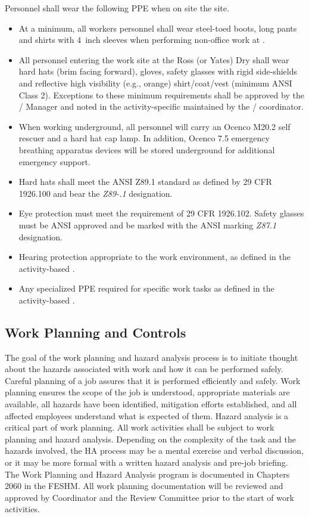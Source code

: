 Personnel shall wear the following PPE when on site the  site.
\begin{itemize}
\item At a minimum, all workers personnel shall wear
  steel-toed boots, long pants and shirts with 4~inch sleeves when
  performing non-office work at . 
  \item All personnel entering the work site at the Ross (or Yates) Dry
    shall wear hard hats (brim facing forward), gloves,
    safety glasses with rigid side-shields and reflective high
    visibility (e.g., orange) shirt/coat/vest (minimum ANSI Class 2).
    Exceptions to these minimum requirements shall be approved by the
    /  Manager and noted in the
    activity-specific  maintained by the /  coordinator.
  \item When working underground, all personnel will carry an Ocenco M20.2 self rescuer
    and a hard hat cap lamp. In addition, Ocenco 7.5 emergency breathing apparatus devices
    will be stored underground for additional emergency support.
  \item Hard hats shall meet the ANSI Z89.1 standard as defined by 29
    CFR 1926.100 and bear the {\em Z89-.1} designation.
   \item Eye protection must meet the requirement of 29 CFR
      1926.102. Safety glasses must be ANSI approved and be marked
      with the ANSI marking {\em Z87.1} designation.
    \item Hearing protection appropriate to the work environment, as
      defined in the activity-based .
    \item Any specialized PPE required for specific work tasks as
      defined in the activity-based . 
\end{itemize}

\subsection{Work Planning and Controls}

The goal of the work planning and hazard analysis process is to
initiate thought about the hazards associated with work and how it can
be performed safely. Careful planning of a job assures that it is
performed efficiently and safely. Work planning ensures the scope of
the job is understood, appropriate materials are available, all
hazards have been identified, mitigation efforts established, and all
affected employees understand what is expected of them. Hazard
analysis is a critical part of work planning. All work activities
shall be subject to work planning and hazard analysis. Depending on
the complexity of the task and the hazards involved, the HA process
may be a mental exercise and verbal discussion, or it may be more
formal with a written hazard analysis and pre-job briefing. The Work
Planning and Hazard Analysis program is documented in Chapters 2060 in
the FESHM. All work planning documentation will be reviewed and
approved by   Coordinator and the 
 Review Committee prior to the start of work activities.

